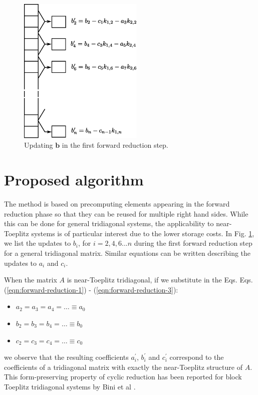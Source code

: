 \documentclass{elsarticle}
\begin{document}
\begin{figure}
\begin{center}
\includegraphics[height=200pt]{img/forward-reduction-step.eps}
\end{center}
\caption{Updating $\bm{b}$ in the first forward reduction step.}
\label{fig:forward-reduction-step}
\end{figure}

\section{Proposed algorithm} \label{sec:proposed-algorithm}

The method is based on precomputing elements 
appearing in the forward reduction phase
so that they can be reused for multiple right hand sides.
While this can be done for general tridiagonal systems,
the applicability to near-Toeplitz systems is
of particular interest due to the lower storage costs.
In Fig. \ref{fig:forward-reduction-step},
we list the updates to
$b_i$, for $i=2, 4, 6 ... n$
during the first forward reduction step
for a general tridiagonal matrix.
Similar equations can be written describing
the updates to $a_i$ and  $c_i$.

When the matrix $A$ is near-Toeplitz tridiagonal,
if we substitute in the Eqs.
Eqs. (\ref{eqn:forward-reduction-1}) -
(\ref{eqn:forward-reduction-3}):

\begin{itemize}
\item [] $a_2 = a_3 = a_4 = \hdots \equiv a_0$
\item [] $b_2 = b_3 = b_4 = \hdots \equiv b_0$
\item [] $c_2 = c_3 = c_4 = \hdots \equiv c_0$
\end{itemize}
%
we observe that the resulting coefficients
$a_i^\prime$, $b_i^\prime$ and $c_i^\prime$
correspond to the coefficients of a tridiagonal matrix with
exactly the near-Toeplitz structure of $A$.
This form-preserving property of cyclic reduction
has been reported for block Toeplitz tridiagonal systems
by Bini et al \cite{bini}.
\end{document}

